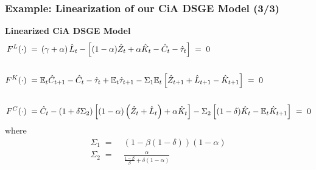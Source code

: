 \documentclass[10pt,c,aspectratio=1610,handout]{beamer}
\begin{document}
\begin{frame}%
  \frametitle{Example: Linearization of our CiA DSGE Model (3/3)}%
  \textbf{Linearized CiA DSGE Model}%
  \vspace*{0.2in}%
  \begin{align}%
    F^L(\cdot) \; = & \; \left(\gamma+\alpha\right) \hat{L}_t - \left[ (1-\alpha) \hat{Z}_t + \alpha \hat{K}_t - \hat{C}_t - \hat{\tau}_t \right] \; = \; 0\\%
    \notag\\%
    F^K(\cdot) \; = & \; \mathbb{E}_t \hat{C}_{t+1} - \hat{C}_t - \hat{\tau}_t + \mathbb{E}_t \hat{\tau}_{t+1} - \Sigma_1 \mathbb{E}_t \left[ \hat{Z}_{t+1} + \hat{L}_{t+1} - \hat{K}_{t+1} \right] \; = \; 0\\%
    \notag\\%
    F^C(\cdot) \; = & \; \hat{C}_t - \left(1+\delta \Sigma_2\right) \left[ (1-\alpha) \left(\hat{Z}_t+\hat{L}_t\right) + \alpha \hat{K}_t \right] - \Sigma_2 \left[ (1-\delta)\hat{K}_t - \mathbb{E}_t \hat{K}_{t+1} \right] \; = \; 0%
  \end{align}%
  where%
  \begin{align*}
    \Sigma_1 \; = & \; \left(1-\beta(1-\delta)\right) (1-\alpha)\\%
    \Sigma_2 \; = & \; \frac{\alpha}{\frac{1-\beta}{\beta}+\delta(1-\alpha)}%
  \end{align*}
\end{frame}%
\end{document}
